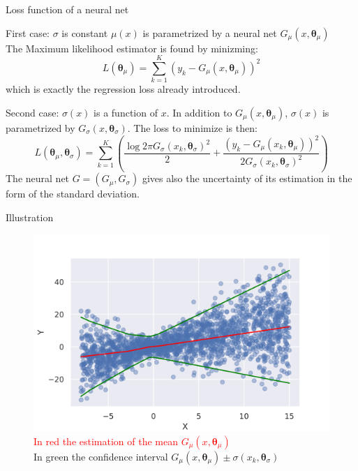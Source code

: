 \documentclass[handout, 10pt]{beamer}
\begin{document}
\begin{frame}{Loss function of a neural net}
   \begin{block}{First case: $\sigma$ is constant}
   $\mu(x)$ is parametrized by a neural net $ G_\mu(x,{\boldsymbol \theta}_\mu)$\\
   The Maximum likelihood estimator is found by minizming:
   $$
L({\boldsymbol \theta}_\mu) =  \sum_{k=1}^{K} (y_k - G_\mu(x,{\boldsymbol \theta}_\mu))^2
$$
which is exactly the regression loss already introduced.
   \end{block}
\pause
\begin{block}{Second case:  $\sigma(x)$ is a function of $x$.}
In addition to $ G_\mu(x,{\boldsymbol \theta}_\mu)$, $\sigma(x)$ is parametrized by $G_\sigma(x,{\boldsymbol \theta}_\sigma)$.
The loss to minimize is then:
$$
L({\boldsymbol \theta}_\mu, {\boldsymbol \theta}_\sigma) = \sum_{k=1}^{K} \left(\frac{\log 2\pi G_\sigma(x_k,{\boldsymbol \theta}_\sigma)^2}{2} + \frac{(y_k - G_\mu(x_k,{\boldsymbol \theta}_\mu))^2}{2 G_\sigma(x_k,{\boldsymbol \theta}_\sigma)^2}\right)
$$
The neural net $G=(G_\mu,  G_\sigma)$ gives  also the uncertainty of its estimation in the form of the standard deviation.
\end{block}
\end{frame}
\begin{frame}{Illustration}
\begin{figure}
    \centering
    \includegraphics[width=.8\textwidth]{fig/MLE.png}\\
    \textcolor{red}{In red the estimation of the mean $ G_\mu(x,{\boldsymbol \theta}_\mu)$}\\
    \textcolor{mygreen}{In green the confidence interval $ G_\mu(x,{\boldsymbol \theta}_\mu) \pm \sigma(x_k,{\boldsymbol \theta}_\sigma) $}
\end{figure}

\end{frame}
\end{document}
